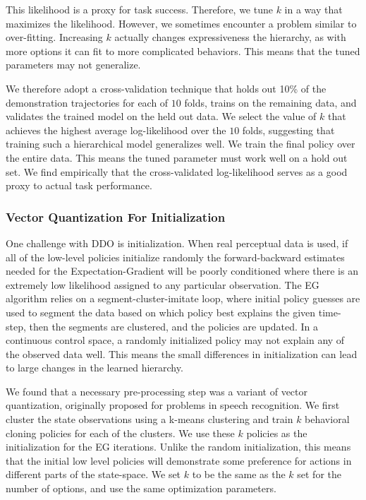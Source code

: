 This likelihood is a proxy for task success.
Therefore, we tune $k$ in a way that maximizes the likelihood.
However, we sometimes encounter a problem similar to over-fitting.
Increasing $k$ actually changes expressiveness the hierarchy, as with more options it can fit to more complicated behaviors.
This means that the tuned parameters may not generalize.

We therefore adopt a cross-validation technique that holds out 10\% of the demonstration trajectories for each of $10$ folds, trains on the remaining data, and validates the trained model on the held out data.
We select the value of $k$ that achieves the highest average log-likelihood over the $10$ folds, suggesting that training such a hierarchical model generalizes well.
We train the final policy over the entire data.
This means the tuned parameter must work well on a hold out set.
We find empirically that the cross-validated log-likelihood serves as a good proxy to actual task performance.

\subsubsection{Vector Quantization For Initialization}
One challenge with DDO is initialization.
When real perceptual data is used, if all of the low-level policies initialize randomly the forward-backward estimates needed for the Expectation-Gradient will be poorly conditioned where there is an extremely low likelihood assigned to any particular observation.
The EG algorithm relies on a segment-cluster-imitate loop, where initial policy guesses are used to segment the data based on which policy best explains the given time-step, then the segments are clustered, and the policies are updated.
In a continuous control space, a randomly initialized policy may not explain any of the observed data well.
This means the small differences in initialization can lead to large changes in the learned hierarchy.

We found that a necessary pre-processing step was a variant of vector quantization, originally proposed for problems in speech recognition. 
We first cluster the state observations using a \textsf{k-means} clustering and train $k$ behavioral cloning policies for each of the clusters.
We use these $k$ policies as the initialization for the EG iterations.
Unlike the random initialization, this means that the initial low level policies will demonstrate some preference for actions in different parts of the state-space.
We set $k$ to be the same as the $k$ set for the number of options, and use the same optimization parameters.